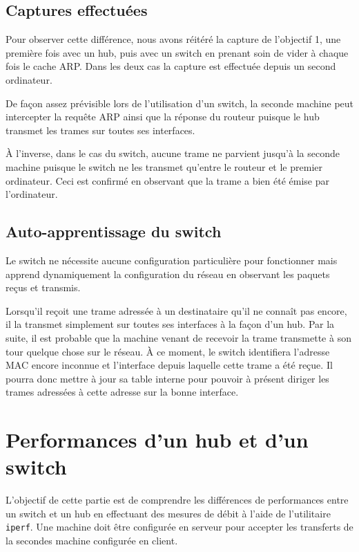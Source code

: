 \documentclass[11pt,a4paper]{article}
\begin{document}
\subsection{Captures effectuées}

Pour observer cette différence, nous avons réitéré la capture de l'objectif 1, une première fois avec un hub, puis avec un switch en prenant soin de vider à chaque fois le cache ARP. Dans les deux cas la capture est effectuée depuis un second ordinateur.

De façon assez prévisible lors de l'utilisation d'un switch, la seconde machine peut intercepter la requête ARP ainsi que la réponse du routeur puisque le hub transmet les trames sur toutes ses interfaces.

À l'inverse, dans le cas du switch, aucune trame ne parvient jusqu'à la seconde machine puisque le switch ne les transmet qu'entre le routeur et le premier ordinateur. Ceci est confirmé en observant que la trame a bien été émise par l'ordinateur.

\subsection{Auto-apprentissage du switch}

Le switch ne nécessite aucune configuration particulière pour fonctionner mais apprend dynamiquement la configuration du réseau en observant les paquets reçus et transmis.

Lorsqu'il reçoit une trame adressée à un destinataire qu'il ne connaît pas encore, il la transmet simplement sur toutes ses interfaces à la façon d'un hub. Par la suite, il est probable que la machine venant de recevoir la trame transmette à son tour quelque chose sur le réseau. À ce moment, le switch identifiera l'adresse MAC encore inconnue et l'interface depuis laquelle cette trame a été reçue. Il pourra donc mettre à jour sa table interne pour pouvoir à présent diriger les trames adressées à cette adresse sur la bonne interface.

\section{Performances d'un hub et d'un switch}

L'objectif de cette partie est de comprendre les différences de performances entre un switch et un hub en effectuant des mesures de débit à l'aide de l'utilitaire \texttt{iperf}. Une machine doit être configurée en serveur pour accepter les transferts de la secondes machine configurée en client.
\end{document}
